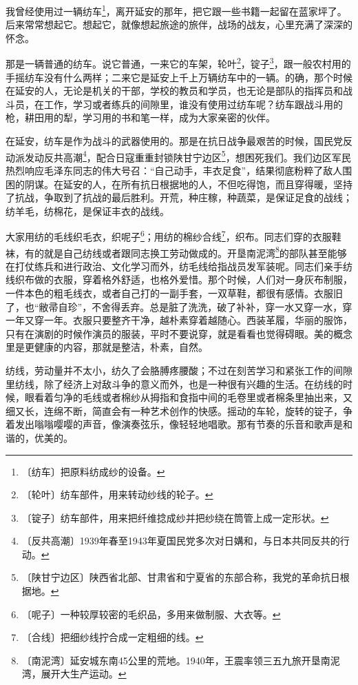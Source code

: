 \documentclass[12pt,UTF-8,openany]{ctexbook}
\begin{document}
\begin{normalsize}
    
    我曾经使用过一辆纺车\footnote{〔纺车〕把原料纺成纱的设备。}，离开延安的那年，把它跟一些书籍一起留在蓝家坪了。后来常常想起它。想起它，就像想起旅途的旅伴，战场的战友，心里充满了深深的怀念。
    
    那是一辆普通的纺车。说它普通，一来它的车架，轮叶\footnote{〔轮叶〕纺车部件，用来转动纱线的轮子。}，锭子\footnote{〔锭子〕纺车部件，用来把纤维捻成纱并把纱绕在筒管上成一定形状。}，跟一般农村用的手摇纺车没有什么两样；二来它是延安上千上万辆纺车中的一辆。的确，那个时候在延安的人，无论是机关的干部，学校的教员和学员，也无论是部队的指挥员和战斗员，在工作，学习或者练兵的间隙里，谁没有使用过纺车呢？纺车跟战斗用的枪，耕田用的犁，学习用的书和笔一样，成为大家亲密的伙伴。
    
    在延安，纺车是作为战斗的武器使用的。那是在抗日战争最艰苦的时候，国民党反动派发动反共高潮\footnote{〔反共高潮〕1939年春至1943年夏国民党多次对日媾和，与日本共同反共的行动。}，配合日寇重重封锁陕甘宁边区\footnote{〔陕甘宁边区〕陕西省北部、甘肃省和宁夏省的东部合称，我党的革命抗日根据地。}，想困死我们。我们边区军民热烈响应毛泽东同志的伟大号召：“自己动手，丰衣足食”，结果彻底粉粹了敌人围困的阴谋。在延安的人，在所有抗日根据地的人，不但吃得饱，而且穿得暖，坚持了抗战，争取到了抗战的最后胜利。开荒，种庄稼，种蔬菜，是保证足食的战线；纺羊毛，纺棉花，是保证丰衣的战线。
    
    大家用纺的毛线织毛衣，织呢子\footnote{〔呢子〕一种较厚较密的毛织品，多用来做制服、大衣等。}；用纺的棉纱合线\footnote{〔合线〕把细纱线拧合成一定粗细的线。}，织布。同志们穿的衣服鞋袜，有的就是自己纺线或者跟同志换工劳动做成的。开垦南泥湾\footnote{〔南泥湾〕延安城东南45公里的荒地。1940年，王震率领三五九旅开垦南泥湾，展开大生产运动。}的部队甚至能够在打仗练兵和进行政治、文化学习而外，纺毛线给指战员发军装呢。同志们亲手纺线织布做的衣服，穿着格外舒适，也格外爱惜。那个时候，人们对一身灰布制服，一件本色的粗毛线衣，或者自己打的一副手套，一双草鞋，都很有感情。衣服旧了，也“敝帚自珍”，不舍得丢弃。总是脏了洗洗，破了补补，穿一水又穿一水，穿一年又穿一年。衣服只要整齐干净，越朴素穿着越随心。西装革履，华丽的服饰，只有在演剧的时候作演员的服装，平时不要说穿，就是看看也觉得碍眼。美的概念里是更健康的内容，那就是整洁，朴素，自然。
    
    纺线，劳动量并不太小，纺久了会胳膊疼腰酸；不过在刻苦学习和紧张工作的间隙里纺线，除了经济上对敌斗争的意义而外，也是一种很有兴趣的生活。在纺线的时候，眼看着匀净的毛线或者棉纱从拇指和食指中间的毛卷里或者棉条里抽出来，又细又长，连绵不断，简直会有一种艺术创作的快感。摇动的车轮，旋转的锭子，争着发出嗡嗡嘤嘤的声音，像演奏弦乐，像轻轻地唱歌。那有节奏的乐音和歌声是和谐的，优美的。
    

\end{normalsize}
\end{document}
